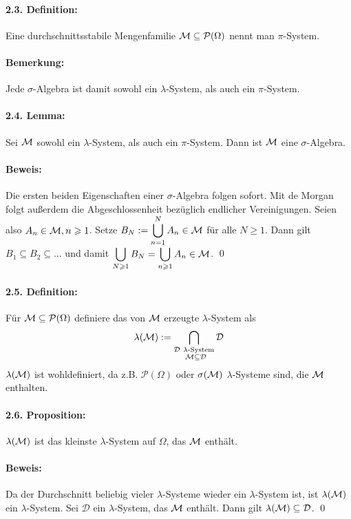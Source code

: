 \documentclass[12pt]{report}
\begin{document}
\paragraph{2.3. Definition:}Eine durchschnittsstabile Mengenfamilie $\mathcal{M}\subseteq\mathcal{P}(\Omega)$ nennt man $\pi$-System.

\paragraph{Bemerkung:}Jede $\sigma$-Algebra ist damit sowohl ein $\lambda$-System, als auch ein $\pi$-System.

\paragraph{2.4. Lemma:}Sei $\mathcal{M}$ sowohl ein $\lambda$-System, als auch ein $\pi$-System. Dann ist $\mathcal{M}$ eine $\sigma$-Algebra.

\paragraph{Beweis:}Die ersten beiden Eigenschaften einer $\sigma$-Algebra folgen sofort. Mit de Morgan folgt au\ss{}erdem die Abgeschlossenheit bez\"uglich endlicher Vereinigungen. Seien also $A_n\in\mathcal{M},n\geqslant1$. Setze $B_N:=\displaystyle\bigcup_{n=1}^NA_n\in\mathcal{M}$ f\"ur alle $N\geq1$. Dann gilt $B_1\subseteq B_2\subseteq\hdots$ und damit $\displaystyle\bigcup_{N\geqslant1}B_N=\bigcup_{n\geqslant1}A_n\in\mathcal{M}$. \qed

\paragraph{2.5. Definition:}F\"ur $\mathcal{M}\subseteq\mathcal{P}(\Omega)$ definiere das von $\mathcal{M}$ erzeugte $\lambda$-System als
$$\lambda(\M):=\bigcap_{\substack{\mathcal{D}\ \lambda\text{-System}\\ \M\subseteq\mathcal{D}}}\mathcal{D}$$
$\lambda(\mathcal{M})$ ist wohldefiniert, da z.B. $\mathcal{P}(\Omega)$ oder $\sigma(\mathcal{M})$ $\lambda$-Systeme sind, die $\mathcal{M}$ enthalten. 

\paragraph{2.6. Proposition:}$\lambda(\mathcal{M})$ ist das kleinste $\lambda$-System auf $\Omega$, das $\mathcal{M}$ enth\"alt. 

\paragraph{Beweis:}Da der Durchschnitt beliebig vieler $\lambda$-Systeme wieder ein $\lambda$-System ist, ist $\lambda(\mathcal{M})$ ein $\lambda$-System. Sei $\mathcal{D}$ ein $\lambda$-System, das $\mathcal{M}$ enth\"alt. Dann gilt $\lambda(\mathcal{M})\subseteq\mathcal{D}$. \qed
\end{document}
